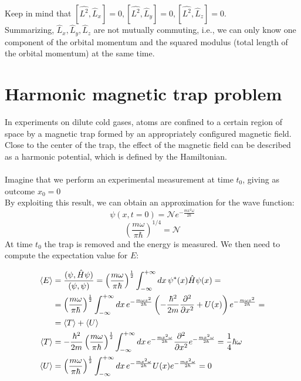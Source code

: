 	Keep in mind that $[\hat{L^2}, \hat{L}_{x}]=0,[\hat{L^2}, \hat{L}_{y}]=0,[\hat{L^2}, \hat{L}_{z}]=0$.\\
	\noindent
	Summarizing,  $\hat{L}_{x},\hat{L}_{y},\hat{L}_{z}$ are not mutually commuting, i.e., we can only know one component of the orbital momentum and the squared modulus (total length of the orbital momentum) at the same time.

\section{Harmonic magnetic trap problem}
In experiments on dilute cold gases, atoms are confined to a certain region of space by a magnetic trap formed by an appropriately configured magnetic field.
Close to the center of the trap, the effect of the magnetic field can be described as a harmonic potential, which is defined by the Hamiltonian.\\
\\
Imagine that we perform an experimental measurement at time $t_0$, giving as outcome $x_{0}=0$ \\
By exploiting this result, we can obtain an approximation for the wave function:
$$\psi(x,t=0)= \mathcal{N} e^{-\frac{m x^{2} \omega}{2 \hbar}}$$
$$
\left(\frac{m \omega}{ \pi \hbar}\right)^{1 / 4}=\mathcal{N}
$$
\noindent
At time $t_0$ the trap is removed and the energy is measured.
We then need to compute the expectation value for $E$:

\begin{align*}
	\expval{E} &=\frac{(\psi, \hat{H} \psi)}{(\psi, \psi)}=\left(\frac{m \omega}{ \pi \hbar}\right)^{\frac{1}{2}} \int_{-\infty}^{+\infty}d x\, \psi^{*}(x) \hat{H} \psi(x)=\\
					 	 &=\left(\frac{m \omega}{ \pi \hbar}\right)^{\frac{1}{2}} \int_{-\infty}^{+\infty} d x\,e^{-\frac{m \omega x^{2}}{2 \hbar}}\left(-\frac{\hbar^{2}}{2 m} \frac{\partial^{2}}{\partial x^{2}}+U(x)\right) e^{-\frac{m \omega x^{2}}{ 2\hbar}}=\\
						 &=\expval{T}+\expval{U}\\
	\expval{T} &=-\frac{\hbar^{2}}{2 m}\left(\frac{m \omega}{\pi \hbar}\right)^{\frac{1}{2}} \int_{-\infty}^{+\infty} d x\, e^{-\frac{m x^{2} \omega}{2 \hbar}} \frac{\partial^{2}}{\partial x^{2}} e^{-\frac{m x^{2} \omega}{2 \hbar}}=\frac{1}{4} \hbar \omega\\
	\expval{U} &=\left(\frac{m \omega}{\pi \hbar}\right)^{\frac{1}{2}} \int_{-\infty}^{+\infty} d x\, e^{-\frac{m x^{2} \omega}{2 \hbar}} U(x) e^{-\frac{m x^{2} \omega}{2 \hbar}}=0
\end{align*}

